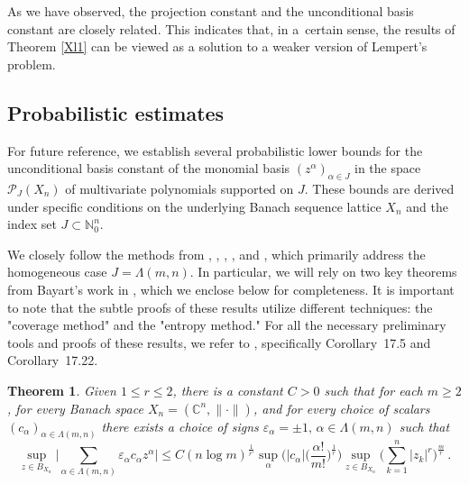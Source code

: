 \documentclass[12pt]{amsart}
\numberwithin{subsection}{section}
\newtheorem{theorem}{Theorem}[section]
\theoremstyle{definition}
\theoremstyle{remark}
\DeclareMathOperator{\mon}{mon}
\DeclareMathOperator{\id}{\mathrm{id}}
\newcommand{\chimon}{\chi_{\mon}}
\begin{document}

As we have observed, the projection constant and the unconditional basis constant are closely related. This indicates that, in
a~certain sense, the results of Theorem \ref{Xl1} can be viewed as a solution to a weaker version of Lempert's problem.


\subsection{Probabilistic estimates}


\label{Probabilistic estimates}

For future reference, we establish several probabilistic lower bounds for the unconditional basis constant of the monomial basis
$(z^\alpha)_{\alpha\in J}$ in the space $\mathcal{P}_{J}(X_n)$ of multivariate polynomials supported on $J$. These bounds are
derived under specific conditions on the underlying Banach sequence lattice $X_n$ and the index set $J \subset \mathbb{N}_0^{n}$.

We closely follow the methods from \cite{bayart2012maximum}, \cite{boas2000majorant}, \cite{defant2004maximum}, \cite{defant2020subgaussian},
and \cite{mastylo2017kahane}, which primarily address the homogeneous case $J = \Lambda(m,n)$. In particular, we will rely on two key
theorems from Bayart’s work in \cite{bayart2012maximum}, which we enclose below for completeness. It is important to note  that the subtle
proofs of these results utilize different techniques: the "coverage method" and the "entropy method." For all the necessary preliminary tools
and proofs of these results, we refer to \cite{defant2019libro}, specifically Corollary~17.5 and Corollary~17.22.


\begin{theorem} \label{Anquetil alfa}
Given  $1 \leq r \leq 2$, there is a constant $C >0$ such that for  each $m \geq 2$, for every Banach space $X_n = (\mathbb{C}^n,\|\cdot\|)$,
and for every choice of scalars $(c_{\alpha})_{\alpha \in \Lambda(m,n)}$ there exists a choice of signs $\varepsilon_{\alpha} = \pm1, \, \alpha \in \Lambda(m,n)$ such that
\[
\sup_{z \in B_{X_n}} \Big\vert \sum_{\alpha \in \Lambda(m,n)} \varepsilon_{\alpha} c_{\alpha} z^{\alpha} \Big\vert
\leq C (n \log m)^{\frac{1}{r'}}  \sup_{\alpha}  \Big(\vert c_{\alpha} \vert \Big( \frac{\alpha !}{m!}\Big)^{\frac{1}{r}} \Big)
\sup_{z \in B_{X_n}} \Big( \sum_{k=1}^{n} \vert z_{k} \vert^{r} \Big)^{\frac{m}{r}}\,.
\]
\end{theorem}
\end{document}
